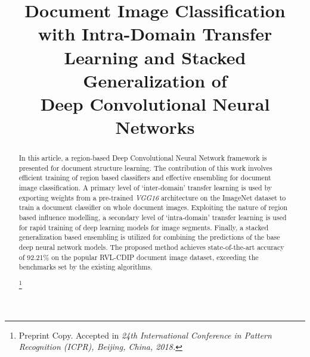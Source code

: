 \documentclass[10pt,conference,a4paper]{IEEEtran}
\newcommand\blfootnote[1]{%
	\begingroup
	\renewcommand\thefootnote{}\footnote{#1}%
	\addtocounter{footnote}{-1}%
	\endgroup
}
\begin{document}
\title{Document Image Classification with Intra-Domain Transfer Learning and Stacked Generalization of \\Deep Convolutional Neural Networks\\
}


\author{
\and
{}
\and
{}
\and
{}




}


\maketitle


\begin{abstract}
In this article, a region-based Deep Convolutional Neural Network framework is presented for document structure learning. The contribution of this work involves efficient training of region based classifiers and effective ensembling for document image classification. A primary level of `inter-domain' transfer learning is used by exporting weights from a pre-trained \textit{VGG16} architecture on the ImageNet dataset to train a document classifier on whole document images. Exploiting the nature of region based influence modelling, a secondary level of `intra-domain' transfer learning is used for rapid training of deep learning models for image segments. Finally, a stacked generalization based ensembling is utilized for combining the predictions of the base deep neural network models. The proposed method achieves state-of-the-art accuracy of 92.21\% on the popular RVL-CDIP document image dataset, exceeding the benchmarks set by the existing algorithms.


\blfootnote{Preprint Copy. Accepted in \textit{24th International Conference in Pattern Recognition (ICPR), Beijing, China, 2018.}}


\end{abstract}
\end{document}

